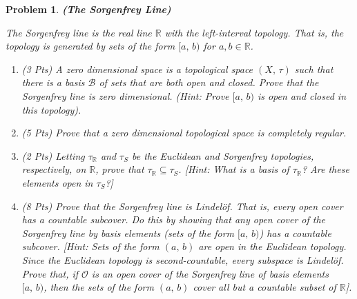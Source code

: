 \documentclass{article}
\theoremstyle{normal}
\newtheorem{problem}{Problem}
\begin{document}
    \begin{problem}
        \textbf{(The Sorgenfrey Line)}
        \par\hfill\par
        The Sorgenfrey line is the real line $\mathbb{R}$ with the left-interval
        topology. That is, the topology is generated by sets of the form
        $[a,\,b)$ for $a,b\in\mathbb{R}$.
        \begin{enumerate}
            \item (3 Pts) A zero dimensional space is a topological space
                $(X,\,\tau)$ such that there is a basis $\mathcal{B}$ of sets
                that are both open and closed. Prove that the Sorgenfrey line
                is zero dimensional. (Hint: Prove $[a,\,b)$ is open and closed
                in this topology).
            \item (5 Pts) Prove that a zero dimensional topological space is
                completely regular.
            \item (2 Pts) Letting $\tau_{\mathbb{R}}$ and $\tau_{S}$ be the
                Euclidean and Sorgenfrey topologies, respectively, on
                $\mathbb{R}$, prove that $\tau_{\mathbb{R}}\subseteq\tau_{S}$.
                [Hint: What is a basis of $\tau_{\mathbb{R}}$? Are these
                elements open in $\tau_{S}$?]
            \item (8 Pts) Prove that the Sorgenfrey line is Lindel\"{o}f. That
                is, every open cover has a countable subcover. Do this by
                showing that any open cover of the Sorgenfrey line by basis
                elements (sets of the form $[a,\,b)$) has a countable subcover.
                [Hint: Sets of the form $(a,\,b)$ are open in the Euclidean
                topology. Since the Euclidean topology is second-countable,
                every subspace is Lindel\"{o}f. Prove that, if
                $\mathcal{O}$ is an open cover of the Sorgenfrey line of basis
                elements $[a,\,b)$, then the sets of the form $(a,\,b)$
                cover all but a countable subset of $\mathbb{R}$].
        \end{enumerate}
    \end{problem}
\end{document}
